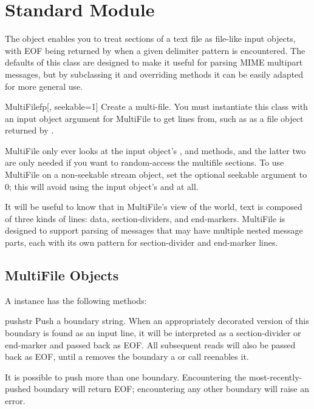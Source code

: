 \section{Standard Module }
\label{module-multifile}

The  object enables you to treat sections of a text
file as file-like input objects, with EOF being returned by
 when a given delimiter pattern is encountered.  The
defaults of this class are designed to make it useful for parsing
MIME multipart messages, but by subclassing it and overriding methods 
it can be easily adapted for more general use.

\begin{classdesc}{MultiFile}{fp[, seekable=1]}
Create a multi-file.  You must instantiate this class with an input
object argument for MultiFile to get lines from, such as as a file
object returned by .

MultiFile only ever looks at the input object's ,
 and  methods, and the latter two are only
needed if you want to random-access the multifile sections. To use
MultiFile on a non-seekable stream object, set the optional seekable
argument to 0; this will avoid using the input object's 
and  at all.
\end{classdesc}

It will be useful to know that in MultiFile's view of the world, text
is composed of three kinds of lines: data, section-dividers, and
end-markers.  MultiFile is designed to support parsing of
messages that may have multiple nested message parts, each with its
own pattern for section-divider and end-marker lines.

\subsection{MultiFile Objects}
\label{MultiFile-objects}

A  instance has the following methods:

\begin{methoddesc}{push}{str}
Push a boundary string.  When an appropriately decorated version of
this boundary is found as an input line, it will be interpreted as a
section-divider or end-marker and passed back as EOF.  All subsequent
reads will also be passed back as EOF, until a  removes
the boundary a or  call reenables it.

It is possible to push more than one boundary.  Encountering the
most-recently-pushed boundary will return EOF; encountering any other
boundary will raise an error.
\end{methoddesc}

